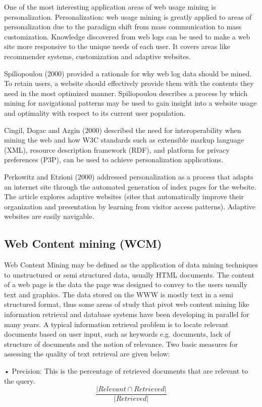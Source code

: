\documentclass{article}
\begin{document}
One of the most interesting application areas of web usage mining is personalization.
Personalization: web usage mining is greatly applied to areas of personalization due to the paradigm shift from mass communication to mass customization. Knowledge discovered from web logs can be used to make a web site more responsive to the unique needs of each user. It covers areas like recommender systems, customization and adaptive websites.
 
Spiliopoulou (2000) provided a rationale for why web log data should be mined. To retain users, a website should effectively provide them with the contents they need in the most optimized manner. Spiliopoulou describes a process by which mining for navigational patterns may be used to gain insight into a website usage and optimality with respect to its current user population.

Cingil, Dogac and Azgin (2000) described the need for interoperability when mining the web and how W3C standards such as extensible markup language (XML), resource description framework (RDF), and platform for privacy preferences (P3P), can be used to achieve personalization applications.

 Perkowitz and Etzioni (2000) addressed personalization as a process that adapts an internet site through the automated generation of index pages for the website. The article explores adaptive websites (sites that automatically improve their organization and presentation by learning from visitor access patterns). Adaptive websites are easily navigable. 
\pagebreak
\subsection{Web Content mining (WCM) }
Web Content Mining may be defined as the application of data mining techniques to unstructured or semi structured data, usually HTML documents. The content of a web page is the data the page was designed to convey to the users usually text and graphics. The data stored on the WWW is mostly text in a semi structured format, thus some areas of study that pivot web content mining like information retrieval and database systems have been developing in parallel for many years. A typical information retrieval problem is to locate relevant documents based on user input, such as keywords e.g. documents,  lack of structure of documents  and the notion of relevance.
Two basic measures for assessing the quality of text retrieval are given below:

•	Precision: This is the percentage of retrieved documents that are relevant to the query.\begin{equation}
\frac{|{Relevant}\cap{Retrieved}|}{|Retrieved|}\end{equation}
  
\end{document}
